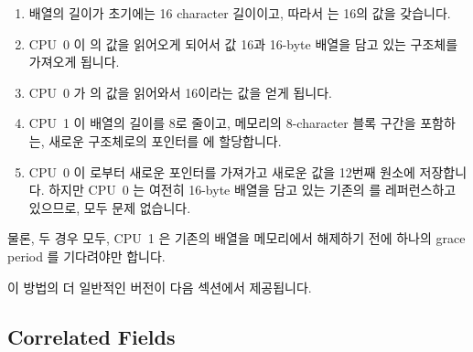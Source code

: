\begin{enumerate}
\item	배열의 길이가 초기에는 16 character 길이이고, 따라서  는
	16의 값을 갖습니다.
\item	CPU~0 이  의 값을 읽어오게 되어서 값 16과 16-byte 배열을 담고
	있는 구조체를 가져오게 됩니다.
\item	CPU~0 가  의 값을 읽어와서 16이라는 값을 얻게 됩니다.
\item	CPU~1 이 배열의 길이를 8로 줄이고, 메모리의 8-character 블록 구간을
	포함하는, 새로운  구조체로의 포인터를  에
	할당합니다.
\item	CPU~0 이  로부터 새로운 포인터를 가져가고 새로운 값을 12번째
	원소에 저장합니다.
	하지만 CPU~0 는 여전히 16-byte 배열을 담고 있는 기존의  를
	레퍼런스하고 있으므로, 모두 문제 없습니다.
\iffalse

\item	The array is initially 16 characters long, and thus \co{->length}
	is equal to 16.
\item	CPU~0 loads the value of \co{->fa}, obtaining a pointer to
	the structure containing the value 16 and the 16-byte array.
\item	CPU~0 loads the value of \co{->fa->length}, obtaining the value 16.
\item	CPU~1 shrinks the array to be of length 8, and assigns a pointer
	to a new \co{foo_a} structure containing an 8-character block
	of memory into \co{->fa}.
\item	CPU~0 picks up the new pointer from \co{->a[]}, and stores a
	new value into element 12.
	But because CPU~0 is still referencing the old \co{foo_a}
	structure that contains the 16-byte array, all is well.
\fi
\end{enumerate}

물론, 두 경우 모두, CPU~1 은 기존의 배열을 메모리에서 해제하기 전에 하나의
grace period 를 기다려야만 합니다.

이 방법의 더 일반적인 버전이 다음 섹션에서 제공됩니다.
\iffalse

Of course, in both cases, CPU~1 must wait for a grace period before
freeing the old array.

A more general version of this approach is presented in the next section.
\fi

\subsection{Correlated Fields}
\label{sec:together:Correlated Fields}

